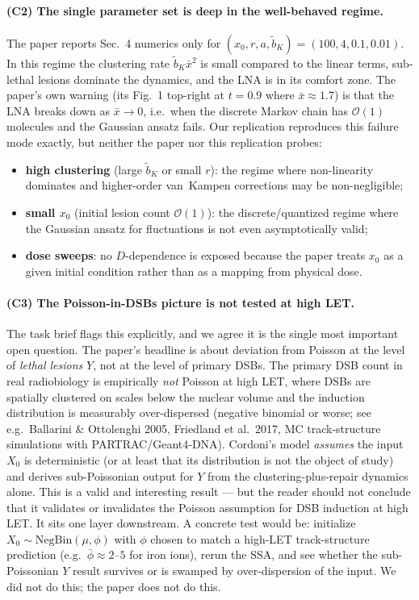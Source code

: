 \documentclass[11pt]{article}
\begin{document}
\paragraph{(C2) The single parameter set is deep in the well-behaved regime.}
The paper reports Sec.~4 numerics only for $(x_0, r, a, \tilde b_K) = (100, 4, 0.1, 0.01)$.  In this regime the clustering rate $\tilde b_K \bar x^2$ is small compared to the linear terms, sub-lethal lesions dominate the dynamics, and the LNA is in its comfort zone.  The paper's own warning (its Fig.~1 top-right at $t=0.9$ where $\bar x\approx 1.7$) is that the LNA breaks down as $\bar x\to 0$, i.e.\ when the discrete Markov chain has $\mathcal O(1)$ molecules and the Gaussian ansatz fails.  Our replication reproduces this failure mode exactly, but neither the paper nor this replication probes:
\begin{itemize}
  \item \textbf{high clustering} (large $\tilde b_K$ or small $r$): the regime where non-linearity dominates and higher-order van~Kampen corrections may be non-negligible;
  \item \textbf{small $x_0$} (initial lesion count $\mathcal O(1)$): the discrete/quantized regime where the Gaussian ansatz for fluctuations is not even asymptotically valid;
  \item \textbf{dose sweeps}: no $D$-dependence is exposed because the paper treats $x_0$ as a given initial condition rather than as a mapping from physical dose.
\end{itemize}

\paragraph{(C3) The Poisson-in-DSBs picture is not tested at high LET.}
The task brief flags this explicitly, and we agree it is the single most important open question.  The paper's headline is about deviation from Poisson at the level of \emph{lethal lesions} $Y$, not at the level of primary DSBs.  The primary DSB count in real radiobiology is empirically \emph{not} Poisson at high LET, where DSBs are spatially clustered on scales below the nuclear volume and the induction distribution is measurably over-dispersed (negative binomial or worse; see e.g.\ Ballarini \& Ottolenghi 2005, Friedland et al.\ 2017, MC track-structure simulations with PARTRAC/Geant4-DNA).  Cordoni's model \emph{assumes} the input $X_0$ is deterministic (or at least that its distribution is not the object of study) and derives sub-Poissonian output for $Y$ from the clustering-plus-repair dynamics alone.  This is a valid and interesting result --- but the reader should not conclude that it validates or invalidates the Poisson assumption for DSB induction at high LET.  It sits one layer downstream.  A concrete test would be: initialize $X_0\sim\mathrm{NegBin}(\mu, \phi)$ with $\phi$ chosen to match a high-LET track-structure prediction (e.g.\ $\bar\phi \approx 2$--$5$ for iron ions), rerun the SSA, and see whether the sub-Poissonian $Y$ result survives or is swamped by over-dispersion of the input.  We did not do this; the paper does not do this.
\end{document}
